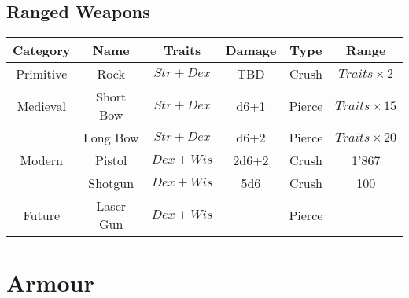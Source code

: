 \subsection{Ranged Weapons}
\begin{center}
\begin{tabular}{c | c | c | c | c | c}
    \textbf{Category} & \textbf{Name} & \textbf{Traits} & \textbf{Damage} & \textbf{Type} & \textbf{Range} \\\hline
    Primitive & Rock        & $Str+Dex$ &  TBD  & Crush  & $Traits \times 2$ \\\hline
    Medieval  & Short Bow   & $Str+Dex$ & d6+1  & Pierce & $Traits \times 15$ \\
              & Long Bow    & $Str+Dex$ & d6+2  & Pierce & $Traits \times 20$ \\\hline
    Modern    & Pistol      & $Dex+Wis$ & 2d6+2 & Crush  & 1'867 \\
              & Shotgun     & $Dex+Wis$ & 5d6   & Crush  & 100 \\\hline
    Future    & Laser Gun   & $Dex+Wis$ &       & Pierce & 
\end{tabular}
\end{center}
\section{Armour}